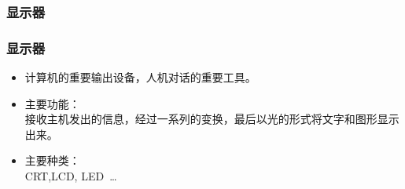 \documentclass{beamer}
\newcommand{\fullPageImage}[2]{
	{
		\usebackgroundtemplate{\texttt{[image: \#1]}}
		\frame[plain]{#2}
	}
}
\begin{document}
\subsubsection{显示器}
\begin{frame}
	\frametitle{显示器}
	\begin{itemize}
		\item 计算机的重要输出设备，人机对话的重要工具。
		\item 主要功能：\\接收主机发出的信息，经过一系列的变换，最后以光的形式将文字和图形显示出来。 
		\item 主要种类：\\CRT,LCD, LED~\dots
	\end{itemize}
\end{frame}

\fullPageImage{images/800px-Apple_I_Computer.jpg}{\transwipe}%

\fullPageImage{images/appleI_med.jpg}{\transwipe}
\fullPageImage{images/apple1_m_monitor.jpg}{\transwipe}
%

\fullPageImage{images/Apple3.jpg}{\transwipe}%
\end{document}

